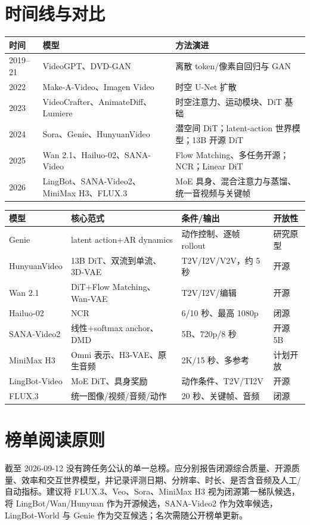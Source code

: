 \documentclass[UTF8,a4paper,12pt]{ctexart}
\begin{document}
\section{时间线与对比}
\begin{longtable}{p{2.2cm}p{4.2cm}p{7.2cm}}
\toprule 时间 & 模型 & 方法演进\\\midrule
2019--21 & VideoGPT、DVD-GAN & 离散 token/像素自回归与 GAN\\
2022 & Make-A-Video、Imagen Video & 时空 U-Net 扩散\\
2023 & VideoCrafter、AnimateDiff、Lumiere & 时空注意力、运动模块、DiT 基础\\
2024 & Sora、Genie、HunyuanVideo & 潜空间 DiT；latent-action 世界模型；13B 开源 DiT\\
2025 & Wan 2.1、Hailuo-02、SANA-Video & Flow Matching、多任务开源；NCR；Linear DiT\\
2026 & LingBot、SANA-Video2、MiniMax H3、FLUX.3 & MoE 具身、混合注意力与蒸馏、统一音视频与关键帧\\\bottomrule
\end{longtable}

\begin{longtable}{p{2.8cm}p{4.4cm}p{4.2cm}p{2.4cm}}
\toprule 模型 & 核心范式 & 条件/输出 & 开放性\\\midrule
Genie & latent action+AR dynamics & 动作控制、逐帧 rollout & 研究原型\\
HunyuanVideo & 13B DiT、双流到单流、3D-VAE & T2V/I2V/V2V，约 5 秒 & 开源\\
Wan 2.1 & DiT+Flow Matching、Wan-VAE & T2V/I2V/编辑 & 开源\\
Hailuo-02 & NCR & 6/10 秒、最高 1080p & 闭源\\
SANA-Video2 & 线性+softmax anchor、DMD & 5B、720p/8 秒 & 开源 5B\\
MiniMax H3 & Omni 表示、H3-VAE、原生音频 & 2K/15 秒、多参考 & 计划开放\\
LingBot-Video & MoE DiT、具身奖励 & 动作条件、T2V/TI2V & 开源\\
FLUX.3 & 统一图像/视频/音频/动作 & 20 秒、关键帧、音频 & 闭源\\\bottomrule
\end{longtable}

\section{榜单阅读原则}
截至 2026-09-12 没有跨任务公认的单一总榜。应分别报告闭源综合质量、开源质量、效率和交互世界模型，并记录评测日期、分辨率、时长、是否含音频及人工/自动指标。建议将 FLUX.3、Veo、Sora、MiniMax H3 视为闭源第一梯队候选，将 LingBot/Wan/Hunyuan 作为开源候选，SANA-Video2 作为效率候选，LingBot-World 与 Genie 作为交互候选；名次需随公开榜单更新。
\end{document}
